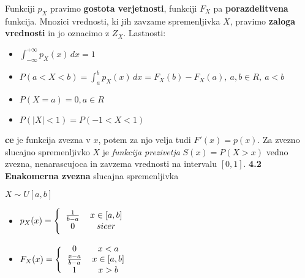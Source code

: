 \documentclass{article}
\begin{document}
\begin{multicols}{2}
Funkciji $p_{X}$ pravimo \textbf{gostota verjetnosti}, funkciji $F_{X}$ pa
\textbf{porazdelitvena} funkcija. Mnozici vrednosti, ki jih zavzame spremenljivka
$X$, pravimo \textbf{zaloga vrednosti} in jo oznacimo z $Z_{X}$.
Lastnosti:
\begin{itemize}
    \item \begin{math}
        \int_{- \infty}^{+ \infty} p_{X}(x) \,dx = 1
    \end{math}
    \item \begin{math}
        P(a < X < b) = \int_{a}^{b} p_{X}(x) \,dx = F_{X}(b) - F_{X}(a),\: a,b \in R,\: a < b
    \end{math}
    \item \begin{math}
        P(X = a) = 0, a \in R
    \end{math}
    \item \begin{math}
        P(|X| < 1) = P(-1 < X < 1)
    \end{math}
\end{itemize}
\textbf{ce} je funkcija zvezna v $x$, potem za njo velja tudi $F'(x) = p(x)$.
Za zvezno slucajno spremenljivko $X$ je \textit{funkcija prezivetja} $S(x) = P(X > x)$
vedno zvezna, nenarascujoca in zavzema vrednosti na intervalu $[0, 1]$.
\textbf{4.2 Enakomerna zvezna} slucajna spremenljivka
\begin{center}
    \begin{math}
        X \sim U[a, b]
    \end{math}
\end{center}

\begin{itemize}
    \item  \begin{math}
        p_{X}(x) =
        \Bigg \{\begin{tabular}{ccc}
          $\frac{1}{b-a}$  & $x \in [a, b]$ & \\
          $0$ & $sicer$ & \\
        \end{tabular}
    \end{math} 
    
     \item \begin{math}
        F_{X}(x) =
        \Bigg \{\begin{tabular}{ccc}
          $0$ & $x < a$ & \\
          $\frac{x - a}{b - a}$  & $x \in [a, b]$ & \\
          $1$ & $x > b$  & \\
        \end{tabular}
    \end{math}
\end{itemize}


\end{multicols}
\end{document}
